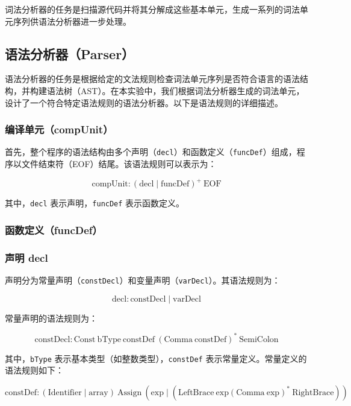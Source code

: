 \documentclass[../main.tex]{subfiles}
\begin{document}
词法分析器的任务是扫描源代码并将其分解成这些基本单元，生成一系列的词法单元序列供语法分析器进一步处理。

\subsection{语法分析器（Parser）}

语法分析器的任务是根据给定的文法规则检查词法单元序列是否符合语言的语法结构，并构建语法树（AST）。在本实验中，我们根据词法分析器生成的词法单元，设计了一个符合特定语法规则的语法分析器。以下是语法规则的详细描述。

\subsubsection{编译单元（compUnit）}

首先，整个程序的语法结构由多个声明（\texttt{decl}）和函数定义（\texttt{funcDef}）组成，程序以文件结束符（EOF）结尾。该语法规则可以表示为：

\[
	\text{compUnit} \colon (\text{decl} \mid \text{funcDef})^+ \ \text{EOF}
\]

其中，\texttt{decl} 表示声明，\texttt{funcDef} 表示函数定义。

\subsubsection{函数定义（funcDef）}


\subsubsection{声明 decl}

声明分为常量声明（\texttt{constDecl}）和变量声明（\texttt{varDecl}）。其语法规则为：

\[
	\text{decl} \colon \text{constDecl} \mid \text{varDecl}
\]

常量声明的语法规则为：

\[
	\text{constDecl} \colon \text{Const} \ \text{bType} \ \text{constDef} \ (\text{Comma} \ \text{constDef})^* \ \text{SemiColon}
\]

其中，\texttt{bType} 表示基本类型（如整数类型），\texttt{constDef} 表示常量定义。常量定义的语法规则如下：

\[
	\text{constDef} \colon (\text{Identifier} \mid \text{array}) \ \text{Assign} \ (\text{exp} \mid (\text{LeftBrace} \ \text{exp} (\text{Comma} \ \text{exp})^* \ \text{RightBrace}))
\]
\end{document}
